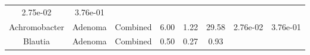 \documentclass[12pt,]{article}
\begin{document}
\begin{longtable}[]{@{}cccccccc@{}}
\begin{minipage}[t]{0.06\columnwidth}
2.75e-02\strut
\end{minipage} & \begin{minipage}[t]{0.06\columnwidth}\centering\strut
3.76e-01\strut
\end{minipage}\tabularnewline
\begin{minipage}[t]{0.19\columnwidth}\centering\strut
Achromobacter\strut
\end{minipage} & \begin{minipage}[t]{0.07\columnwidth}\centering\strut
Adenoma\strut
\end{minipage} & \begin{minipage}[t]{0.09\columnwidth}\centering\strut
Combined\strut
\end{minipage} & \begin{minipage}[t]{0.03\columnwidth}\centering\strut
6.00\strut
\end{minipage} & \begin{minipage}[t]{0.14\columnwidth}\centering\strut
1.22\strut
\end{minipage} & \begin{minipage}[t]{0.14\columnwidth}\centering\strut
29.58\strut
\end{minipage} & \begin{minipage}[t]{0.06\columnwidth}\centering\strut
2.76e-02\strut
\end{minipage} & \begin{minipage}[t]{0.06\columnwidth}\centering\strut
3.76e-01\strut
\end{minipage}\tabularnewline
\begin{minipage}[t]{0.19\columnwidth}\centering\strut
Blautia\strut
\end{minipage} & \begin{minipage}[t]{0.07\columnwidth}\centering\strut
Adenoma\strut
\end{minipage} & \begin{minipage}[t]{0.09\columnwidth}\centering\strut
Combined\strut
\end{minipage} & \begin{minipage}[t]{0.03\columnwidth}\centering\strut
0.50\strut
\end{minipage} & \begin{minipage}[t]{0.14\columnwidth}\centering\strut
0.27\strut
\end{minipage} & \begin{minipage}[t]{0.14\columnwidth}\centering\strut
0.93\strut
\end{minipage} & \begin{minipage}[t]{0.06\columnwidth}\centering\strut

\end{minipage}
\end{longtable}
\end{document}

